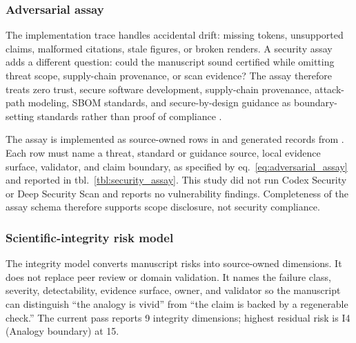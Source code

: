 \documentclass[
  english,
]{article}
\begin{document}
\subsubsection{Adversarial assay}\label{adversarial-assay}

The implementation trace handles accidental drift: missing tokens,
unsupported claims, malformed citations, stale figures, or broken
renders. A security assay adds a different question: could the
manuscript sound certified while omitting threat scope, supply-chain
provenance, or scan evidence? The assay therefore treats zero trust,
secure software development, supply-chain provenance, attack-path
modeling, SBOM standards, and secure-by-design guidance as
boundary-setting standards rather than proof of compliance
\citep{nist_sp800_207_zero_trust, nist_sp800_218_ssdf, slsa_v1_2, sigstore_docs, mitre_attack, cyclonedx_spec, spdx_spec, cisa_secure_by_design}.

The assay is implemented as source-owned rows in
 and generated records from
. Each row must name a threat, standard
or guidance source, local evidence surface, validator, and claim
boundary, as specified by eq.~\ref{eq:adversarial_assay} and reported in
tbl.~\ref{tbl:security_assay}. This study did not run Codex Security or
Deep Security Scan and reports no vulnerability findings. Completeness
of the assay schema therefore supports scope disclosure, not security
compliance.

\subsubsection{Scientific-integrity risk
model}\label{scientific-integrity-risk-model}

The integrity model converts manuscript risks into source-owned
dimensions. It does not replace peer review or domain validation. It
names the failure class, severity, detectability, evidence surface,
owner, and validator so the manuscript can distinguish ``the analogy is
vivid'' from ``the claim is backed by a regenerable check.'' The current
pass reports 9 integrity dimensions; highest residual risk is I4
(Analogy boundary) at 15.
\end{document}
